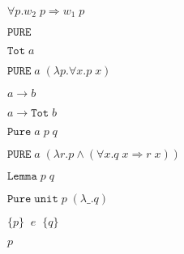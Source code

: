 \documentclass[10pt]{book}
\begin{document}
\begin{mdSnippets}
\begin{mdInlineSnippet}[39508e6477e5b0769cd574b12c6495bd]
$\forall p. w_2\;p \Rightarrow w_1\;p$\end{mdInlineSnippet}%
\begin{mdInlineSnippet}[83365c67bd390d059181734569c55a0a]%
$\mathtt{PURE}$\end{mdInlineSnippet}%
\begin{mdInlineSnippet}[3c32103caf39276ad5b2f56c355708e0]%
$\mathtt{Tot}\;a$\end{mdInlineSnippet}%
\begin{mdInlineSnippet}[f49715a72c14c51b982dd08793b01631]%
$\mathtt{PURE}\;a\;(\lambda p. \forall x. p\;x)$\end{mdInlineSnippet}%
\begin{mdInlineSnippet}[5426f4abac92b141e07b42fb6f57a3d7]%
$a \rightarrow b$\end{mdInlineSnippet}%
\begin{mdInlineSnippet}%
$a \rightarrow \mathtt{Tot}\;b$\end{mdInlineSnippet}%
\begin{mdInlineSnippet}%
$\mathtt{Pure}\;a\;p\;q$\end{mdInlineSnippet}%
\begin{mdInlineSnippet}[11ea982839b94007fd54dc863b16e5e9]%
$\mathtt{PURE}\;a\;(\lambda r. p \wedge (\forall x. q\;x \Rightarrow r\;x))$\end{mdInlineSnippet}%
\begin{mdInlineSnippet}%
$\mathtt{Lemma}\;p\;q$\end{mdInlineSnippet}%
\begin{mdInlineSnippet}[89be3df759764a9eeba8c88b1647440d]%
$\mathtt{Pure}\;\mathtt{unit}\;p\;(\lambda \_. q)$\end{mdInlineSnippet}%
\begin{mdInlineSnippet}%
$\{p\}\;\;e\;\;\{q\}$\end{mdInlineSnippet}%
\begin{mdInlineSnippet}[83878c91171338902e0fe0fb97a8c47a]%
$p$\end{mdInlineSnippet}%
\begin{mdInlineSnippet}[589475617a8654ee215dd1ec926d990c]%

\end{mdInlineSnippet}
\end{mdSnippets}
\end{document}
